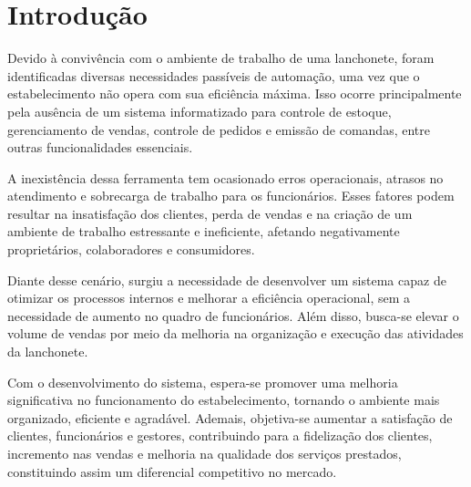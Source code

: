 \chapter[Introdução]{Introdução}

Devido à convivência com o ambiente de trabalho de uma lanchonete, foram identificadas diversas necessidades passíveis de automação, uma vez que o estabelecimento não opera com sua eficiência máxima. Isso ocorre principalmente pela ausência de um sistema informatizado para controle de estoque, gerenciamento de vendas, controle de pedidos e emissão de comandas, entre outras funcionalidades essenciais.

A inexistência dessa ferramenta tem ocasionado erros operacionais, atrasos no atendimento e sobrecarga de trabalho para os funcionários. Esses fatores podem resultar na insatisfação dos clientes, perda de vendas e na criação de um ambiente de trabalho estressante e ineficiente, afetando negativamente proprietários, colaboradores e consumidores.

Diante desse cenário, surgiu a necessidade de desenvolver um sistema capaz de otimizar os processos internos e melhorar a eficiência operacional, sem a necessidade de aumento no quadro de funcionários. Além disso, busca-se elevar o volume de vendas por meio da melhoria na organização e execução das atividades da lanchonete.

Com o desenvolvimento do sistema, espera-se promover uma melhoria significativa no funcionamento do estabelecimento, tornando o ambiente mais organizado, eficiente e agradável. Ademais, objetiva-se aumentar a satisfação de clientes, funcionários e gestores, contribuindo para a fidelização dos clientes, incremento nas vendas e melhoria na qualidade dos serviços prestados, constituindo assim um diferencial competitivo no mercado.
